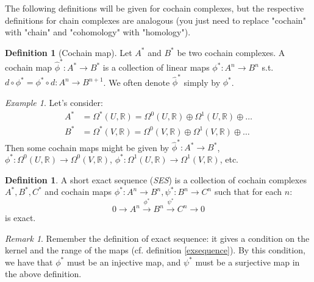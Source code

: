 \documentclass[a4paper,11pt,titlepage, article, oneside]{memoir}
\numberwithin{equation}{section}
\theoremstyle{definition}
\newtheorem{definition}[theorem]{Definition}
\theoremstyle{remark}
\newtheorem{remark}[theorem]{Remark}
\newtheorem{example}[theorem]{Example}
\newcommand{\rfield}{\mathbb{R}}
\begin{document}
The following definitions will be given for cochain complexes, but the respective definitions for chain complexes are analogous (you just need to replace "cochain" with "chain" and "cohomology" with "homology").

\begin{definition}[Cochain map]
  Let $A^*$ and $B^*$ be two cochain complexes.
  A cochain map $\hat \phi^* \colon A^* \rightarrow B^*$ is a collection of linear maps $\phi^* \colon A^n \rightarrow B^n$ s.t. $d \circ \phi^* = \phi^* \circ d \colon A^n \rightarrow B^{n+1}$. We often denote $\hat \phi^*$ simply by $\phi^*$.
\end{definition}

\begin{tcolorbox}\begin{example}
  Let's consider:
  \begin{align*}
    A^* &= \Omega^*(U, \rfield) = \Omega^0(U, \rfield) \oplus \Omega^1(U, \rfield) \oplus \ldots \\
    B^* &= \Omega^*(V, \rfield) = \Omega^0(V, \rfield) \oplus \Omega^1(V, \rfield) \oplus \ldots
  \end{align*}
  Then some cochain maps might be given by $\hat \phi^*\colon A^* \rightarrow B^*$, $\phi^* \colon \Omega^0(U, \rfield) \rightarrow \Omega^0(V, \rfield)$, $\phi^* \colon \Omega^1(U, \rfield) \rightarrow \Omega^1(V, \rfield)$, etc.
\end{example}\end{tcolorbox}

\begin{definition}
  A short exact sequence (\textit{SES}) is a collection of cochain complexes $A^*, B^*, C^*$ and cochain maps $\phi^* \colon A^n \rightarrow B^n, \psi^* \colon B^n \rightarrow C^n$ such that for each $n$:
  \begin{equation}
    0 \longrightarrow A^n \overset{\phi^*}{\longrightarrow} B^n \overset{\psi^*}{\longrightarrow} C^n \longrightarrow 0
  \end{equation}
  is exact.
\end{definition}

\begin{remarkbox}\begin{remark}
  Remember the definition of exact sequence: it gives a condition on the kernel and the range of the maps (cf. definition \ref{exsequence}).
  By this condition, we have that $\phi^*$ must be an injective map, and $\psi^*$ must be a surjective map in the above definition.
\end{remark}\end{remarkbox}
\end{document}
